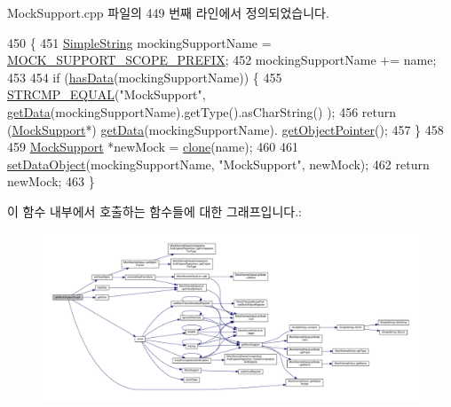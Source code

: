 Mock\+Support.\+cpp 파일의 449 번째 라인에서 정의되었습니다.


\begin{DoxyCode}
450 \{
451     \hyperlink{class_simple_string}{SimpleString} mockingSupportName = \hyperlink{_mock_support_8cpp_a2e36416069ab893a6ebc6caf240d44be}{MOCK\_SUPPORT\_SCOPE\_PREFIX};
452     mockingSupportName += name;
453 
454     \textcolor{keywordflow}{if} (\hyperlink{class_mock_support_a10272444b06c9b8d32bd41d50575d396}{hasData}(mockingSupportName)) \{
455         \hyperlink{_utest_macros_8h_ade1dda09c948fee9ceb853bc6dd5f3cb}{STRCMP\_EQUAL}(\textcolor{stringliteral}{"MockSupport"}, \hyperlink{class_mock_support_a541dfcf28b8737a8a6bb7b548594c9a4}{getData}(mockingSupportName).getType().asCharString()
      );
456         \textcolor{keywordflow}{return} (\hyperlink{class_mock_support}{MockSupport}*) \hyperlink{class_mock_support_a541dfcf28b8737a8a6bb7b548594c9a4}{getData}(mockingSupportName).
      \hyperlink{class_mock_named_value_a4d4696a9a24da96598cfbe4865c23c66}{getObjectPointer}();
457     \}
458 
459     \hyperlink{class_mock_support}{MockSupport} *newMock = \hyperlink{class_mock_support_a3ba369d95973ddb4bcd6cfffd32a3c2e}{clone}(name);
460 
461     \hyperlink{class_mock_support_a7ce6bf5b39ce367f9f6ee1be9fdee3c0}{setDataObject}(mockingSupportName, \textcolor{stringliteral}{"MockSupport"}, newMock);
462     \textcolor{keywordflow}{return} newMock;
463 \}
\end{DoxyCode}


이 함수 내부에서 호출하는 함수들에 대한 그래프입니다.\+:
\nopagebreak
\begin{figure}[H]
\begin{center}
\leavevmode
\includegraphics[width=350pt]{class_mock_support_aba4ec397373a176c470264b0689a983f_cgraph}
\end{center}
\end{figure}




